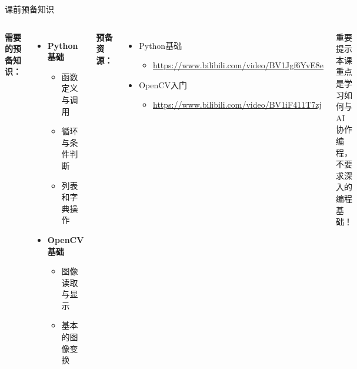 \documentclass[aspectratio=169, 10pt]{beamer}
\begin{document}
\begin{frame}
	\titlepage
\end{frame}

\begin{frame}{课前预备知识}
	\begin{columns}
		\textbf{需要的预备知识：}
		\begin{itemize}
			\item \textbf{Python基础}
			\begin{itemize}
				\item 函数定义与调用
				\item 循环与条件判断
				\item 列表和字典操作
			\end{itemize}
			\item \textbf{OpenCV基础}
			\begin{itemize}
				\item 图像读取与显示
				\item 基本的图像变换
			\end{itemize}
		\end{itemize}

		\textbf{预备资源：}
		\begin{itemize}
			\item Python基础
			\begin{itemize}
				\item \url{https://www.bilibili.com/video/BV1Jgf6YvE8e}
			\end{itemize}
			\item OpenCV入门
			\begin{itemize}
				\item \url{https://www.bilibili.com/video/BV1iF411T7zj}
			\end{itemize}
		\end{itemize}

		\vspace{0.3cm}
		\begin{alertblock}{重要提示}
			本课重点是学习如何与AI协作编程，不要求深入的编程基础！
		\end{alertblock}
	\end{columns}
\end{frame}
\end{document}
